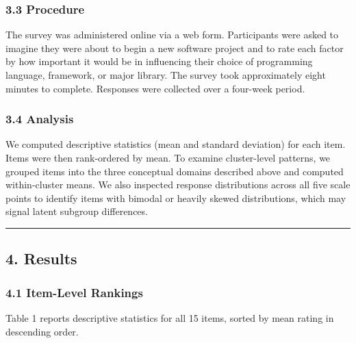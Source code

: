 \documentclass[
]{article}
\begin{document}
\subsubsection{3.3 Procedure}\label{procedure}

The survey was administered online via a web form. Participants were
asked to imagine they were about to begin a new software project and to
rate each factor by how important it would be in influencing their
choice of programming language, framework, or major library. The survey
took approximately eight minutes to complete. Responses were collected
over a four-week period.

\subsubsection{3.4 Analysis}\label{analysis}

We computed descriptive statistics (mean and standard deviation) for
each item. Items were then rank-ordered by mean. To examine
cluster-level patterns, we grouped items into the three conceptual
domains described above and computed within-cluster means. We also
inspected response distributions across all five scale points to
identify items with bimodal or heavily skewed distributions, which may
signal latent subgroup differences.

\begin{center}\rule{0.5\linewidth}{0.5pt}\end{center}

\subsection{4. Results}\label{results}

\subsubsection{4.1 Item-Level Rankings}\label{item-level-rankings}

Table 1 reports descriptive statistics for all 15 items, sorted by mean
rating in descending order.
\end{document}

